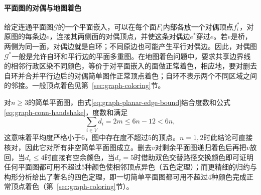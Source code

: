 \paragraph{平面图的对偶与地图着色}
给定连通平面图$\mathcal G$的一个平面嵌入，可以在每个面$F_i$内部各放一个对偶顶点$f_i^*$，对原图的每条边$e$，连接其两侧面的对偶顶点，并使这条对偶边$e^*$穿过$e$。若$e$是桥，两侧为同一面，对偶边就是自环；不同原边也可能产生平行对偶边。因此，对偶图$\mathcal G^*$一般是允许自环和平行边的平面多重图。在地图着色问题中，要求共享边界线的相邻行政区染不同颜色，等价于对平面嵌入的面做正常着色，相应地，要对删去自环并合并平行边后的对偶简单图作正常顶点着色；自环不表示两个不同区域之间的邻接。一般顶点着色见第~\ref{sec:graph-coloring}节。

对$n\geq3$的简单平面图，由式\eqref{eq:graph-planar-edge-bound}结合度数和公式\eqref{eq:graph-conn-handshake}，度数和满足
\[
\sum_{i\in V}d_i = 2m \leq 6n - 12 < 6n,
\]
这意味着平均度严格小于$6$，图中存在度不超过$5$的顶点。$n=1,2$时此结论可直接核对，因此它对所有非空简单平面图成立。删去$v$对剩余平面图递归着色后再把$v$放回，当$d_v\leq 4$时直接有空余颜色，当$d_v=5$时借助双色交替路径交换颜色即可证明任何平面图都可用不超过$5$种颜色使相邻顶点异色（五色定理）；而更精细的归约与构形分析给出了著名的四色定理，即一切简单平面图都可用不超过$4$种颜色完成正常顶点着色（第~\ref{sec:graph-coloring}节）。
